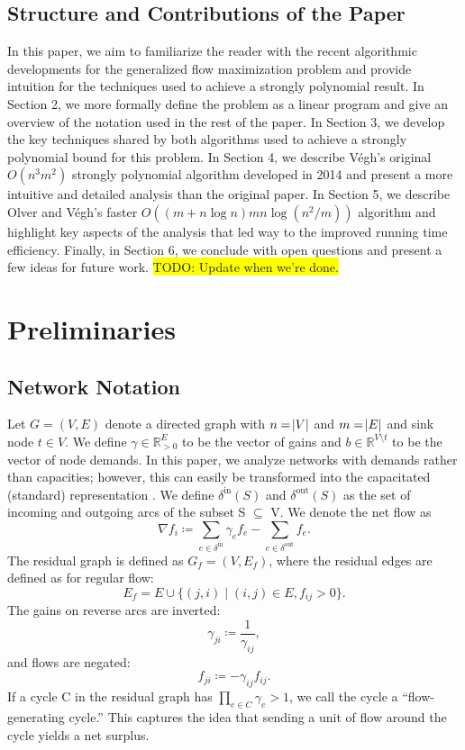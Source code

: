 \documentclass[12pt]{article}
\theoremstyle{definition}
\newcommand{\R}{\mathbb{R}}
\newcommand{\nfi}{\nabla f_i}
\newcommand{\din}{\delta^{\text{in}}}
\newcommand{\dout}{\delta^{\text{out}}}
\newcommand{\todo}[1]{\colorbox{yellow}{TODO: #1}}
\begin{document}
	\subsection{Structure and Contributions of the Paper} In this paper, we aim to familiarize the reader with the recent algorithmic developments for the generalized flow maximization problem and provide intuition for the techniques used to achieve a strongly polynomial result. In Section 2, we more formally define the problem as a linear program and give an overview of the notation used in the rest of the paper. In Section 3, we develop the key techniques shared by both algorithms used to achieve a strongly polynomial bound for this problem. In Section 4, we describe Végh's original $O(n^3m^2)$ strongly polynomial algorithm developed in 2014 and present a more intuitive and detailed analysis than the original paper. In Section 5, we describe Olver and Végh's faster $O((m + n\log n)mn\log(n^2 / m))$ algorithm and highlight key aspects of the analysis that led way to the improved running time efficiency. Finally, in Section 6, we conclude with open questions and present a few ideas for future work. \todo{Update when we're done.}
    
\section{Preliminaries}

	\subsection{Network Notation}
    Let $G=(V,E)$ denote a directed graph with $n=\abs{V}$ and $m=\abs{E}$ and sink node $t \in V$. We define $\gamma \in \R_{>0}^E$ to be the vector of gains and $b \in \R^{V \setminus t}$ to be the vector of node demands. In this paper, we analyze networks with demands rather than capacities; however, this can easily be transformed into the capacitated (standard) representation \cite{Vegh2013}. We define $\din(S)$ and $\dout(S)$ as the set of incoming and outgoing arcs of the subset S $\subseteq$ V. We denote the net flow as
    \[ \nfi \coloneqq \sum_{e \in \din} \gamma_e f_e - \sum_{e \in \dout} f_e.\]
    The residual graph is defined as $G_f = (V, E_f)$, where the residual edges are defined
    as for regular flow:
    \[ E_f = E \cup \{ (j, i) \mid (i, j) \in E, f_{ij} > 0 \}. \]
    The gains on reverse arcs are inverted:
    \[ \gamma_{ji} \coloneqq \frac{1}{\gamma_{ij}}, \]
    and flows are negated:
    \[ f_{ji} \coloneqq -\gamma_{ij}f_{ij}. \]
    If a cycle C in the residual graph has $\prod_{e \in C} \gamma_e > 1$,
    we call the cycle a ``flow-generating cycle.'' This captures the idea that sending
    a unit of flow around the cycle yields a net surplus.
    
\end{document}
